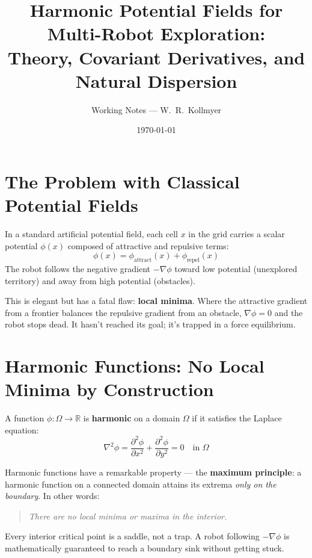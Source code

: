 \documentclass[11pt]{article}
\title{Harmonic Potential Fields for Multi-Robot Exploration:\\
Theory, Covariant Derivatives, and Natural Dispersion}
\author{Working Notes --- W.\ R.\ Kollmyer}
\date{\today}
\begin{document}
\maketitle

\section{The Problem with Classical Potential Fields}

In a standard artificial potential field, each cell $x$ in the grid
carries a scalar potential $\phi(x)$ composed of attractive and
repulsive terms:
\begin{equation}
    \phi(x) = \phi_{\text{attract}}(x) + \phi_{\text{repel}}(x)
\end{equation}
The robot follows the negative gradient $-\nabla\phi$ toward low
potential (unexplored territory) and away from high potential
(obstacles).

This is elegant but has a fatal flaw: \textbf{local minima}.  Where
the attractive gradient from a frontier balances the repulsive
gradient from an obstacle, $\nabla\phi = 0$ and the robot stops
dead.  It hasn't reached its goal; it's trapped in a force
equilibrium.

\section{Harmonic Functions: No Local Minima by Construction}

A function $\phi : \Omega \to \mathbb{R}$ is \textbf{harmonic} on a
domain $\Omega$ if it satisfies the Laplace equation:
\begin{equation}
    \nabla^2 \phi = \frac{\partial^2 \phi}{\partial x^2} +
    \frac{\partial^2 \phi}{\partial y^2} = 0
    \quad \text{in } \Omega
    \label{eq:laplace}
\end{equation}

Harmonic functions have a remarkable property --- the
\textbf{maximum principle}: a harmonic function on a connected domain
attains its extrema \emph{only on the boundary}.  In other words:

\begin{quote}
\emph{There are no local minima or maxima in the interior.}
\end{quote}

Every interior critical point is a saddle, not a trap.  A robot
following $-\nabla\phi$ is mathematically guaranteed to reach a
boundary sink without getting stuck.
\end{document}
